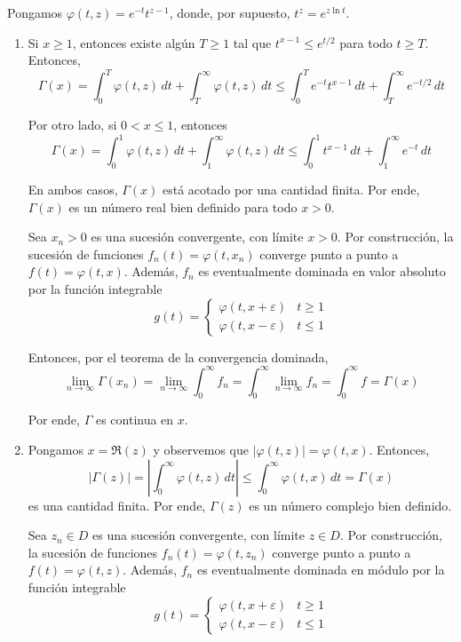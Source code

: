\begin{solution}
Pongamos $\varphi(t, z) = e^{-t} t^{z-1}$, donde, por supuesto, $t^z = e^{z \ln t}$.

\begin{enumerate}[label=\alph*)]
    \item Si $x \ge 1$, entonces existe algún $T \ge 1$ tal que $t^{x-1} \le e^{t/2}$ para todo $t \ge T$. Entonces,
    $$
    \Gamma(x)
        = \int_0^T \varphi(t, z) \, dt + \int_T^\infty \varphi(t, z) \, dt
        \le \int_0^T e^{-t} t^{x-1} \, dt + \int_T^\infty e^{-t/2} \, dt
    $$
    
    Por otro lado, si $0 < x \le 1$, entonces
    $$
    \Gamma(x)
        = \int_0^1 \varphi(t, z) \, dt + \int_1^\infty \varphi(t, z) \, dt
        \le \int_0^1 t^{x-1} \, dt + \int_1^\infty e^{-t} \, dt
    $$
    
    En ambos casos, $\Gamma(x)$ está acotado por una cantidad finita. Por ende, $\Gamma(x)$ es un número real bien definido para todo $x > 0$.
    
    Sea $x_n > 0$ es una sucesión convergente, con límite $x > 0$. Por construcción, la sucesión de funciones $f_n(t) = \varphi(t, x_n)$ converge punto a punto a $f(t) = \varphi(t, x)$. Además, $f_n$ es eventualmente dominada en valor absoluto por la función integrable
    $$
    g(t) =
    \begin{cases}
        \varphi(t, x + \varepsilon) & t \ge 1 \\
        \varphi(t, x - \varepsilon) & t \le 1
    \end{cases}
    $$
    
    Entonces, por el teorema de la convergencia dominada,
    $$
    \lim_{n \to \infty} \Gamma(x_n)
        = \lim_{n \to \infty} \int_0^\infty f_n
        = \int_0^\infty \lim_{n \to \infty} f_n
        = \int_0^\infty f
        = \Gamma(x)
    $$
    
    Por ende, $\Gamma$ es continua en $x$.
    
    \item Pongamos $x = \Re(z)$ y observemos que $|\varphi(t, z)| = \varphi(t, x)$. Entonces,
    $$
    |\Gamma(z)|
        = \left| \int_0^\infty \varphi(t, z) \, dt \right|
        \le \int_0^\infty \varphi(t, x) \, dt
        = \Gamma(x)
    $$
    es una cantidad finita. Por ende, $\Gamma(z)$ es un número complejo bien definido.
    
    Sea $z_n \in D$ es una sucesión convergente, con límite $z \in D$. Por construcción, la sucesión de funciones $f_n(t) = \varphi(t, z_n)$ converge punto a punto a $f(t) = \varphi(t, z)$. Además, $f_n$ es eventualmente dominada en módulo por la función integrable
    $$
    g(t) =
    \begin{cases}
        \varphi(t, x + \varepsilon) & t \ge 1 \\
        \varphi(t, x - \varepsilon) & t \le 1
    \end{cases}
    $$
    

\end{enumerate}
\end{solution}

